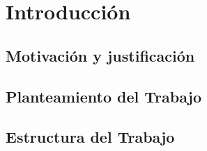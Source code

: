 \chapter{Introducción}

\section{Motivación y justificación}

\section{Planteamiento del Trabajo}

\section{Estructura del Trabajo}
